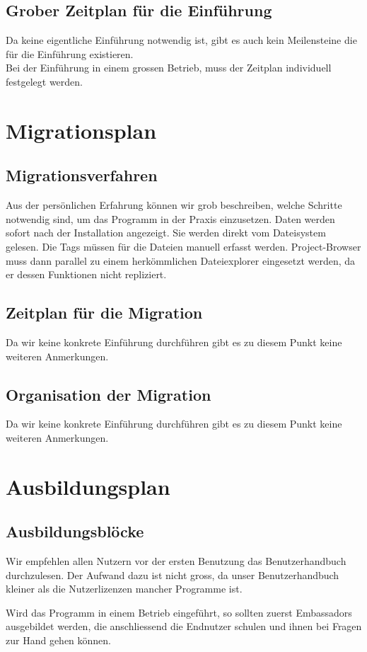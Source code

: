 \documentclass[10pt,paper=a4,final]{scrartcl}
\begin{document}
\subsection{Grober Zeitplan f\"ur die Einf\"uhrung}
Da keine eigentliche Einführung notwendig ist, gibt es auch kein Meilensteine die für die Einführung existieren.\\
Bei der Einführung in einem grossen Betrieb, muss der Zeitplan individuell festgelegt werden.
\section{Migrationsplan}
\subsection{Migrationsverfahren}
Aus der persönlichen Erfahrung können wir grob beschreiben, welche Schritte notwendig sind, um das Programm in der Praxis einzusetzen.
Daten werden sofort nach der Installation angezeigt. Sie werden direkt vom Dateisystem gelesen. Die Tags müssen für die Dateien manuell erfasst werden.
Project-Browser muss dann parallel zu einem herkömmlichen Dateiexplorer eingesetzt werden, da er dessen Funktionen nicht repliziert.
\subsection{Zeitplan f\"ur die Migration}
Da wir keine konkrete Einführung durchführen gibt es zu diesem Punkt keine weiteren Anmerkungen.
\subsection{Organisation der Migration}
Da wir keine konkrete Einführung durchführen gibt es zu diesem Punkt keine weiteren Anmerkungen.
\section{Ausbildungsplan}
\subsection{Ausbildungsbl\"ocke}
Wir empfehlen allen Nutzern vor der ersten Benutzung das Benutzerhandbuch\cite[Abschnitt 'Benutzerhandbuch']{realisierungsbericht} durchzulesen. Der Aufwand dazu ist nicht gross, da unser Benutzerhandbuch kleiner als die Nutzerlizenzen mancher Programme ist.

Wird das Programm in einem Betrieb eingeführt, so sollten zuerst Embassadors ausgebildet werden, die anschliessend die Endnutzer schulen und ihnen bei Fragen zur Hand gehen können.
\end{document}
